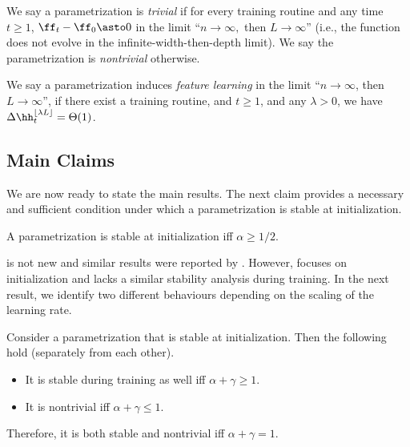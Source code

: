 \begin{defn}[Nontriviality]
    We say a parametrization is \emph{trivial} if for every training routine and any time $t\ge1$, $\ff_{t}-\ff_{0}\asto0$ in the limit ``$n\to\infty,$ then $L \to \infty$'' (i.e., the function does not evolve in the infinite-width-then-depth limit). We say the parametrization is \emph{nontrivial} otherwise.
  \end{defn}

\begin{defn}
    We say a parametrization induces \emph{feature learning} in the limit ``$n \to \infty$, then $L \to \infty$'', if there exist a training routine, and $t\ge1$, and any $\lambda > 0$, we have $\Delta\hh_{t}^{\lfloor\lambda L\rfloor} = \Theta(1)$.
  \end{defn}

\subsection{Main Claims}
 We are now ready to state the main results. The next claim provides a necessary and sufficient condition under which a parametrization is stable at initialization.

\begin{claim}\label{clm:stability_init}
    A parametrization is stable at initialization iff $\alpha\ge1/2$.
\end{claim}
 is not new and similar results were reported by \citet{hayou21stable}. However, \citet{hayou21stable} focuses on initialization and lacks a similar stability analysis during training. In the next result, we identify two different behaviours depending on the scaling of the learning rate.
\begin{claim}\label{clm:stable_non_trivial}
Consider a parametrization that is stable at initialization. Then the following hold (separately from each other).
\begin{itemize}
    \item It is stable during training as well iff $\alpha + \gamma \ge 1$.
    \item It is nontrivial iff $\alpha + \gamma \le 1$.
\end{itemize}
Therefore, it is both stable and nontrivial iff $\alpha + \gamma = 1$.
\end{claim}

